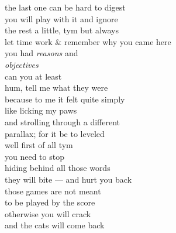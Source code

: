 the last one can be hard to digest\\
you will play with it  and ignore\\
the rest a little, tym but always\\
let time work \& remember why you came here\\
you had \textit{reasons} and\\
\textit{objectives}\\

can you at least\\
hum, tell me what they were\\
because to me it felt quite simply\\
like licking my paws\\
and strolling through a different\\
parallax; for it be to leveled\\

well first of all tym\\
you need to stop\\
hiding behind all those words\\
they will bite --- and hurt you back\\
those games are not meant\\
to be played by the score\\
otherwise you will crack\\
and the cats will come back
